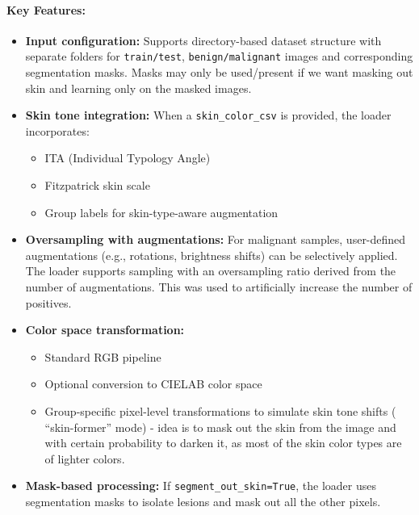 \paragraph{Key Features:}
\begin{itemize}
    \item \textbf{Input configuration:} Supports directory-based dataset structure with separate folders for \texttt{train/test}, \texttt{benign/malignant} images and corresponding segmentation masks. Masks may only be used/present if we want masking out skin and learning only on the masked images.
    
    \item \textbf{Skin tone integration:} When a \texttt{skin\_color\_csv} is provided, the loader incorporates:
    \begin{itemize}
        \item ITA (Individual Typology Angle)
        \item Fitzpatrick skin scale
        \item Group labels for skin-type-aware augmentation
    \end{itemize}
    \item \textbf{Oversampling with augmentations:} For malignant samples, user-defined augmentations (e.g., rotations, brightness shifts) can be selectively applied. The loader supports sampling with an oversampling ratio derived from the number of augmentations. This was used to artificially increase the number of positives.
    
    \item \textbf{Color space transformation:} 
    \begin{itemize}
        \item Standard RGB pipeline
        \item Optional conversion to CIELAB color space
        \item Group-specific pixel-level transformations to simulate skin tone shifts ( “skin-former” mode) - idea is to mask out the skin from the image and with certain probability to darken it, as most of the skin color types are of lighter colors.
    \end{itemize}

    \item \textbf{Mask-based processing:} If \texttt{segment\_out\_skin=True}, the loader uses segmentation masks to isolate lesions and mask out all the other pixels.
    
\end{itemize}

